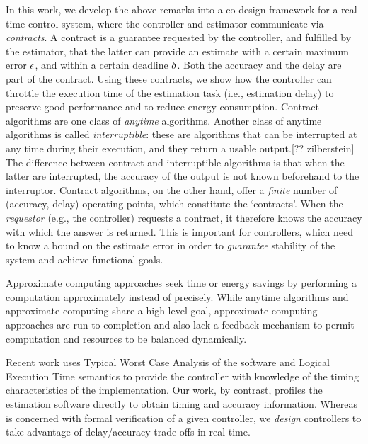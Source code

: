 

In this work, we develop the above remarks into a co-design framework for a real-time control system, where the controller and estimator communicate via \emph{contracts}.
A contract is a guarantee requested by the controller, and fulfilled by the estimator, that the latter can provide an estimate with a certain maximum error $\epsilon$, and within a certain deadline $\delta$.
Both the accuracy and the delay are part of the contract.
Using these contracts, we show how the controller can throttle the execution time of the estimation task (i.e., estimation delay) to preserve good performance and to reduce energy consumption.
Contract algorithms are one class of \emph{anytime} algorithms.%
Another class of anytime algorithms is called \emph{interruptible}: these are algorithms that can be interrupted at any time during their execution, and they return a usable output.[?? zilberstein]
The difference between contract and interruptible algorithms is that when the latter are interrupted, the accuracy of the output is not known beforehand to the interruptor.
Contract algorithms, on the other hand, offer a \emph{finite} number of (accuracy, delay) operating points, which constitute the `contracts'. 
When the \emph{requestor} (e.g., the controller) requests a contract, it therefore knows the accuracy with which the answer is returned.
This is important for controllers, which need to know a bound on the estimate error in order to \emph{guarantee} stability of the system and achieve functional goals.

Approximate computing approaches \cite{loop-perf,rely,npu} seek time or energy
savings by performing a computation approximately instead of precisely. While
anytime algorithms and approximate computing share a high-level goal,
approximate computing approaches are run-to-completion and also lack a feedback
mechanism to permit computation and resources to be balanced dynamically.

Recent work \cite{FrehseHQW14_Formal} uses Typical Worst Case Analysis of the software and Logical Execution Time semantics to provide the controller with knowledge of the timing characteristics of the implementation.
Our work, by contrast, profiles the estimation software directly to obtain timing and accuracy information. 
Whereas \cite{FrehseHQW14_Formal} is concerned with formal verification of a given controller, we \emph{design} controllers to take advantage of delay/accuracy trade-offs in real-time.

